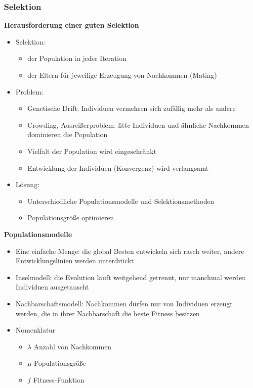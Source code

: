 \subsubsection{Selektion}
\textbf{Herausforderung einer guten Selektion}
\begin{itemize}
	\item Selektion:
	\begin{itemize}
		\item der Population in jeder Iteration
		\item der Eltern für jeweilige Erzeugung von Nachkommen (Mating)
	\end{itemize}
	\item Problem:
	\begin{itemize}
		\item Genetische Drift: Individuen vermehren sich zufällig mehr als andere
		\item Crowding, Ausreißerproblem: fitte Individuen und ähnliche Nachkommen dominieren die Population
		\item Vielfalt der Population wird eingeschränkt
		\item Entwicklung der Individuen (Konvergenz) wird verlangsamt
	\end{itemize}
	\item Lösung:
	\begin{itemize}
		\item Unterschiedliche Populationsmodelle und Selektionsmethoden
		\item Populationsgröße optimieren
	\end{itemize}
\end{itemize}
%
\textbf{Populationsmodelle}
\begin{itemize}
	\item Eine einfache Menge: die global Besten entwickeln sich rasch weiter, andere Entwicklungslinien werden unterdrückt
	\item Inselmodell: die Evolution läuft weitgehend getrennt, nur manchmal werden Individuen ausgetauscht
	\item Nachbarschaftsmodell: Nachkommen dürfen nur von Individuen erzeugt werden, die in ihrer Nachbarschaft die beste Fitness besitzen
	\item Nomenklatur
	\begin{itemize}
		\item $\lambda$ Anzahl von Nachkommen
		\item $\mu$ Populationsgröße
		\item $f$ Fitness-Funktion
	\end{itemize}
\end{itemize}
